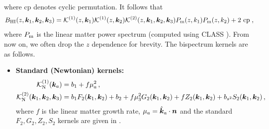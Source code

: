 where cp denotes cyclic permutation. It follows that
\begin{equation}
B_{\rm HI}(z, \bm{k}_{1}, \bm{k}_{2}, \bm{k}_{3}) = \mathcal{K}^{(1)}(z, \bm{k}_{1})\mathcal{K}^{(1)}(z, \bm{k}_{2})\mathcal{K}^{(2)}(z, \bm{k}_{1}, \bm{k}_{2}, \bm{k}_{3})P_{\rm m} (z, k_{1})P_{\rm m} (z, k_{2}) + \text{2 cp}\;, \label{e1.5}
\end{equation} 
where $P_{\rm m} $ is the linear matter power spectrum (computed using CLASS \cite{Blas:2011rf}).  From now on, we often drop the $z$ dependence for brevity.  
The  bispectrum kernels are as follows.
\begin{itemize}
\item
{\bf Standard (Newtonian) kernels:}
\begin{align}
\mathcal{K}^{(1)}_{\rm N}(\bm{k}_{a}) &= b_{1}+f\mu_{a}^{2}\,,  \label{e1.7} \\ 
\mathcal{K}^{(2)}_{\rm N}(\bm{k}_{1}, \bm{k}_{2},{\bm{k}_3}) &= b_{1}F_{2}(\bm{k}_{1}, \bm{k}_{2}) + b_{2} + f\mu_{3}^{2}G_{2}(\bm{k}_{1}, \bm{k}_{2}) +{fZ_2}(\bm{k}_{1}, \bm{k}_{2})
+ b_{s^{2}}S_{2}(\bm{k}_{1}, \bm{k}_{2})\,, \label{e1.8}
\end{align}
where $f$ is the linear matter growth rate, $\mu_a=\hat{\bm {k}}_a\cdot\bm {n}$ and the standard $F_2,G_2,Z_2,S_2$ kernels are given in \cite{Maartens:2019yhx}.


\end{itemize}
